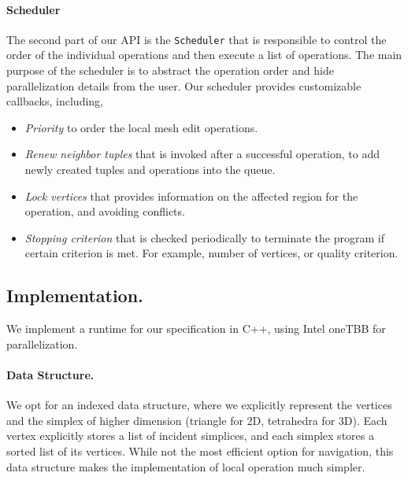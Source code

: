 \paragraph{Scheduler}
The second part of our API is the \texttt{Scheduler} that is responsible to control the order of the individual operations and then execute a list of operations. The main purpose of the scheduler is to abstract the operation order and hide parallelization details from the user. Our scheduler provides customizable callbacks, including,
\begin{itemize}
    \item \emph{Priority} to order the local mesh edit operations.
    \item \emph{Renew neighbor tuples} that is invoked after a successful operation, to add newly created tuples and operations into the queue.
    \item \emph{Lock vertices} that provides information on the affected region for the operation, and avoiding conflicts.
    \item \emph{Stopping criterion} that is checked periodically to terminate the program if certain criterion is met. For example, number of vertices, or quality criterion.
\end{itemize}






\subsection{Implementation.}

We implement a runtime for our specification in C++, using Intel oneTBB for parallelization.

\paragraph{Data Structure.} We opt for an indexed data structure, where we explicitly represent the vertices and the simplex of higher dimension (triangle for 2D, tetrahedra for 3D). Each vertex explicitly stores a list of incident simplices, and each simplex stores a sorted list of its vertices. While not the most efficient option for navigation, this data structure makes the implementation of local operation much simpler. 

